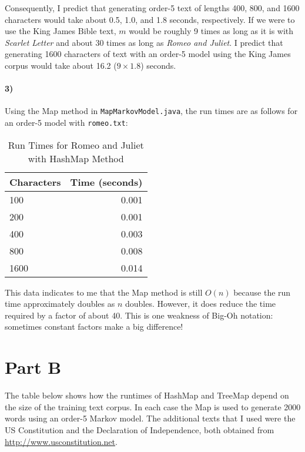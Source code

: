 \documentclass[12pt]{article}
\begin{document}
Consequently, I predict that generating order-5 text of lengths 400, 800, and 1600 characters would take about 0.5, 1.0, and 1.8 seconds, respectively. If we were to use the King James Bible text, $m$ would be roughly 9 times as long as it is with \emph{Scarlet Letter} and about 30 times as long as \emph{Romeo and Juliet}. I predict that generating 1600 characters of text with an order-5 model using the King James corpus would take about 16.2 ($9\times1.8$) seconds. 

\paragraph{3)} Using the Map method in \texttt{MapMarkovModel.java}, the run times are as follows for an order-5 model with \texttt{romeo.txt}:

\begin{table}[h]
\caption{Run Times for Romeo and Juliet with HashMap Method}
\begin{center}
\begin{tabular}{lr}
Characters & Time (seconds) \\
\hline
100 & 0.001 \\
200 & 0.001\\
400 & 0.003 \\
800 & 0.008 \\
1600 & 0.014 \\
\end{tabular}
\end{center}
\end{table}

This data indicates to me that the Map method is still $O(n)$ because the run time approximately doubles as $n$ doubles. However, it does reduce the time required by a factor of about 40. This is one weakness of Big-Oh notation: sometimes constant factors make a big difference! 

\section*{Part B}

The table below shows how the runtimes of HashMap and TreeMap depend on the size of the training text corpus. In each case the Map is used to generate 2000 words using an order-5 Markov model. The additional texts that I used were the US Constitution and the Declaration of Independence, both obtained from \url{http://www.usconstitution.net}.
\end{document}
